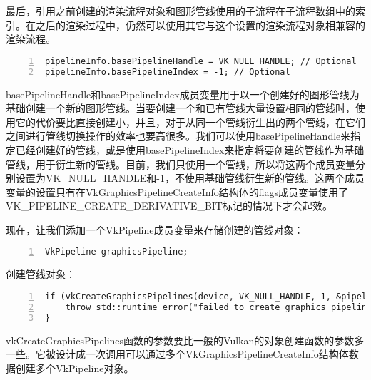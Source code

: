 \documentclass{ctexart}
\begin{document}
最后，引用之前创建的渲染流程对象和图形管线使用的子流程在子流程数组中的索引。在之后的渲染过程中，仍然可以使用其它与这个设置的渲染流程对象相兼容的渲染流程。

\begin{lstlisting}[language={[ANSI]C},keywordstyle=\color{blue!70},commentstyle=\color{red!50!green!50!blue!50},frame=shadowbox, rulesepcolor=\color{red!20!green!20!blue!20},basicstyle=\small,numbers=left, numberstyle=\tiny,breaklines=true]
pipelineInfo.basePipelineHandle = VK_NULL_HANDLE; // Optional
pipelineInfo.basePipelineIndex = -1; // Optional
\end{lstlisting}

basePipelineHandle和basePipelineIndex成员变量用于以一个创建好的图形管线为基础创建一个新的图形管线。当要创建一个和已有管线大量设置相同的管线时，使用它的代价要比直接创建小，并且，对于从同一个管线衍生出的两个管线，在它们之间进行管线切换操作的效率也要高很多。我们可以使用basePipelineHandle来指定已经创建好的管线，或是使用basePipelineIndex来指定将要创建的管线作为基础管线，用于衍生新的管线。目前，我们只使用一个管线，所以将这两个成员变量分别设置为VK\_NULL\_HANDLE和-1，不使用基础管线衍生新的管线。这两个成员变量的设置只有在VkGraphicsPipelineCreateInfo结构体的flags成员变量使用了VK\_PIPELINE\_CREATE\_DERIVATIVE\_BIT标记的情况下才会起效。

现在，让我们添加一个VkPipeline成员变量来存储创建的管线对象：

\begin{lstlisting}[language={[ANSI]C},keywordstyle=\color{blue!70},commentstyle=\color{red!50!green!50!blue!50},frame=shadowbox, rulesepcolor=\color{red!20!green!20!blue!20},basicstyle=\small,numbers=left, numberstyle=\tiny,breaklines=true]
VkPipeline graphicsPipeline;
\end{lstlisting}

创建管线对象：

\begin{lstlisting}[language={[ANSI]C},keywordstyle=\color{blue!70},commentstyle=\color{red!50!green!50!blue!50},frame=shadowbox, rulesepcolor=\color{red!20!green!20!blue!20},basicstyle=\small,numbers=left, numberstyle=\tiny,breaklines=true]
if (vkCreateGraphicsPipelines(device, VK_NULL_HANDLE, 1, &pipelineInfo, nullptr, &graphicsPipeline) != VK_SUCCESS) {
	throw std::runtime_error("failed to create graphics pipeline!");
}
\end{lstlisting}

vkCreateGraphicsPipelines函数的参数要比一般的Vulkan的对象创建函数的参数多一些。它被设计成一次调用可以通过多个VkGraphicsPipelineCreateInfo结构体数据创建多个VkPipeline对象。
\end{document}
